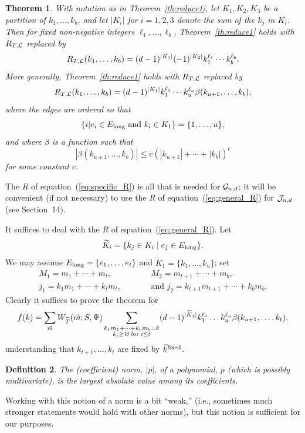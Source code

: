 \documentclass[12pt]{article}
\newtheorem{theorem}{Theorem}[section]
\newtheorem{definition}[theorem]{Definition}
\newcommand{\El}{{E_{\rm long}}}
\newcommand{\veckf}{{\vec k}^{\rm fixed}}
\newcommand{\cg}{{\cal G}}
\newcommand{\cj}{{\cal J}}
\newcommand{\cjnd}{\cj_{n,d}}
\newcommand{\cgnd}{\cg_{n,d}}
\newcommand{\cl}{{\cal L}}
\newcommand{\tset}{{\Psi}}
\newcommand{\ned}{{e}}
\newcommand{\proof}{{\par\noindent {\bf Proof}\space\space}}
\begin{document}
\begin{theorem}\label{th:reduce3}
With notation as in Theorem~\ref{th:reduce1}, let
$K_1,K_2,K_3$ be a partition of $k_1,\ldots,k_b$, and let $|K_i|$ for
$i=1,2,3$ denote the sum of the $k_j$ in $K_i$.  Then for fixed non-negative
integers $\ell_1,\ldots,\ell_b$, Theorem~\ref{th:reduce1} holds with
$R_{T,\cl}$ replaced by
\begin{equation}\label{eq:specific_R}
R_{T,\cl}(k_1,\ldots,k_b) = 
(d-1)^{|K_1|}(-1)^{|K_2|}k_1^{\ell_1}\cdots
k_b^{\ell_b}.
\end{equation}
More generally, Theorem~\ref{th:reduce1} holds with
$R_{T,\cl}$ replaced by
\begin{equation}\label{eq:general_R}
R_{T,\cl}(k_1,\ldots,k_b) = 
(d-1)^{|K_1|} k_1^{\ell_1}\cdots
k_u^{\ell_u} \beta(k_{u+1},\ldots,k_b),
\end{equation}
where the edges are ordered so that
$$
\{ i | \mbox{$e_i\in \El$ and $k_i\in K_1$} \} = \{1,\ldots,u\},
$$
and where $\beta$ is a function such
that
$$
|\beta(k_{u+1},\ldots,k_b)| \le c(|k_{u+1}|+\cdots+|k_b|)^c
$$
for some constant $c$.
\end{theorem}
The $R$ of equation~(\ref{eq:specific_R}) is all that is needed for $\cgnd$;
it will be convenient (if not necessary) to use the $R$ of
equation~(\ref{eq:general_R}) for $\cjnd$ (see Section~14).
\proof
It suffices to deal with the $R$ of
equation~(\ref{eq:general_R}).
Let 
$$
\widetilde K_i = \{ k_j\in K_i \mid \ned_j\in \El \} .
$$
We may assume $\El=\{\ned_1,\ldots,
\ned_t\}$
and $\widetilde K_1=\{k_1,\ldots,k_u\}$;
set 
$$
\begin{array}{lll}
M_1=m_1+\cdots+m_t, & \qquad & M_2=m_{t+1}+\cdots+m_b, \\
j_1=k_1m_1+\cdots+k_tm_t, & & 
\mbox{and  $j_2=k_{t+1}m_{t+1}+\cdots+k_bm_b$.} \end{array}
$$
Clearly it suffices to prove the theorem for
$$
f(k)=\sum_{\vec m} W_{\widetilde T}(\vec m;S,\tset) 
\sum_{\substack{k_1m_1+\cdots+k_b m_b=k\\ k_i\ge B\;{\rm for}\; i\le t}}
(d-1)^{|\widetilde K_1|}
k_1^{\ell_1}\ldots k_u^{\ell_u}\beta(k_{u+1},\ldots,k_t),
$$
understanding that $k_{t+1},\ldots,k_t$ are fixed by $\veckf$.

\begin{definition} The {\em (coefficient) norm}, $|p|$, of a polynomial, $p$
(which is possibly multivariate), is the largest absolute value among
its coefficients.
\end{definition}
Working with this notion of a norm is a bit ``weak,'' (i.e., sometimes
much stronger statements would hold with other norms), 
but this notion is sufficient for our
purposes.
\end{document}
